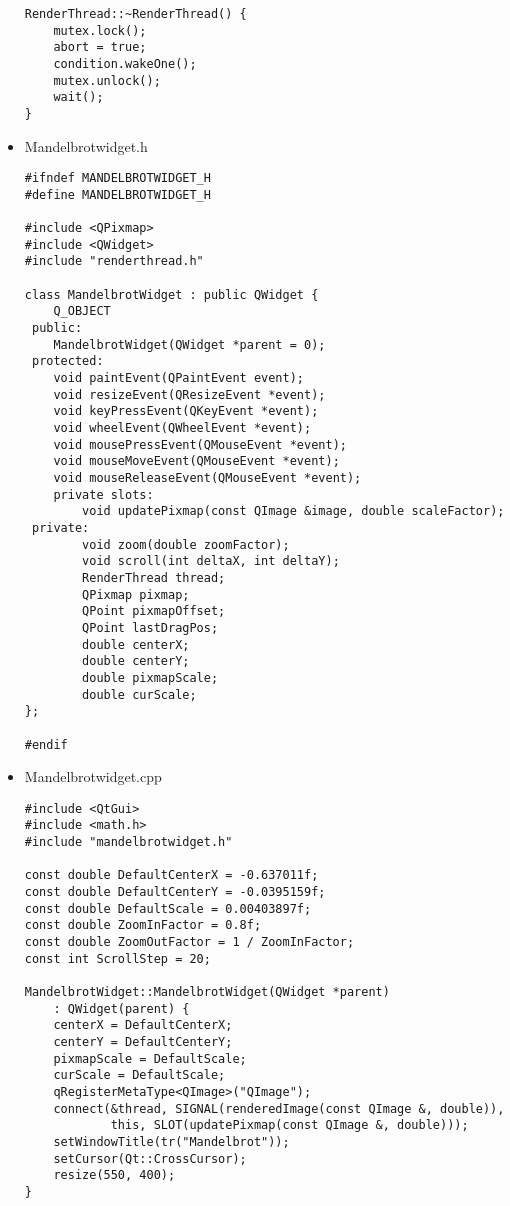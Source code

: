 \documentclass[9pt,b5paper]{article}
\begin{document}
\begin{itemize}
\begin{lstlisting}
RenderThread::~RenderThread() {
    mutex.lock();
    abort = true;
    condition.wakeOne();
    mutex.unlock();
    wait();
}
\end{lstlisting}
\item Mandelbrotwidget.h
\lstset{language=java,label= ,caption= ,numbers=none}
\begin{lstlisting}
#ifndef MANDELBROTWIDGET_H
#define MANDELBROTWIDGET_H

#include <QPixmap>
#include <QWidget>
#include "renderthread.h"

class MandelbrotWidget : public QWidget {
    Q_OBJECT
 public:
    MandelbrotWidget(QWidget *parent = 0);
 protected:
    void paintEvent(QPaintEvent event);
    void resizeEvent(QResizeEvent *event);
    void keyPressEvent(QKeyEvent *event);
    void wheelEvent(QWheelEvent *event);
    void mousePressEvent(QMouseEvent *event);
    void mouseMoveEvent(QMouseEvent *event);
    void mouseReleaseEvent(QMouseEvent *event);
    private slots:
        void updatePixmap(const QImage &image, double scaleFactor);
 private:
        void zoom(double zoomFactor);
        void scroll(int deltaX, int deltaY);
        RenderThread thread;
        QPixmap pixmap;
        QPoint pixmapOffset;
        QPoint lastDragPos;
        double centerX;
        double centerY;
        double pixmapScale;
        double curScale;
};

#endif
\end{lstlisting}
\item Mandelbrotwidget.cpp
\lstset{language=java,label= ,caption= ,numbers=none}
\begin{lstlisting}
#include <QtGui>
#include <math.h>
#include "mandelbrotwidget.h"

const double DefaultCenterX = -0.637011f;
const double DefaultCenterY = -0.0395159f;
const double DefaultScale = 0.00403897f;
const double ZoomInFactor = 0.8f;
const double ZoomOutFactor = 1 / ZoomInFactor;
const int ScrollStep = 20;

MandelbrotWidget::MandelbrotWidget(QWidget *parent)
    : QWidget(parent) {
    centerX = DefaultCenterX;
    centerY = DefaultCenterY;
    pixmapScale = DefaultScale;
    curScale = DefaultScale;
    qRegisterMetaType<QImage>("QImage");
    connect(&thread, SIGNAL(renderedImage(const QImage &, double)),
            this, SLOT(updatePixmap(const QImage &, double)));
    setWindowTitle(tr("Mandelbrot"));
    setCursor(Qt::CrossCursor);
    resize(550, 400);
}


\end{lstlisting}
\end{itemize}
\end{document}

